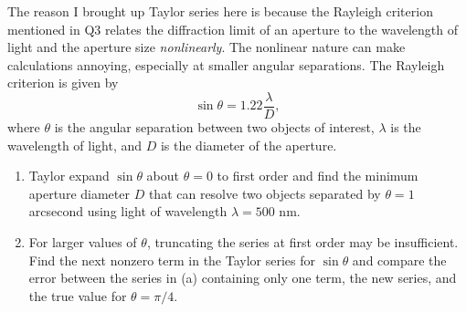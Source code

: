 \documentclass{article}
\begin{document}
\begin{tcolorbox}[colframe=blue!50!black, arc=2mm, title=\textsc{Practice 3 (Enrichment)}]
	The reason I brought up Taylor series here is because the Rayleigh criterion mentioned in Q3 relates the diffraction limit of an aperture to the wavelength of light and the aperture size \textit{nonlinearly}. The nonlinear nature can make calculations annoying, especially at smaller angular separations. The Rayleigh criterion is given by
	\[
		\sin \theta = 1.22 \frac{\lambda}{D},
	\]
	where $\theta$ is the angular separation between two objects of interest, $\lambda$ is the wavelength of light, and $D$ is the diameter of the aperture.
	\begin{enumerate}[label=(\alph*)]
		\item Taylor expand $\sin \theta$ about $\theta = 0$ to first order and find the minimum aperture diameter $D$ that can resolve two objects separated by $\theta = 1$ arcsecond using light of wavelength $\lambda = 500$ nm.
		\item For larger values of $\theta$, truncating the series at first order may be insufficient. Find the next nonzero term in the Taylor series for $\sin\theta$ and compare the error between the series in (a) containing only one term, the new series, and the true value for $\theta=\pi / 4$.
	\end{enumerate} 
\end{tcolorbox}

	
\end{document}
